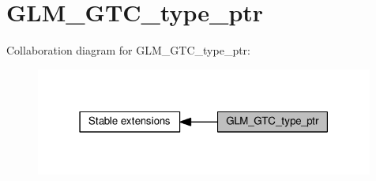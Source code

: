 \hypertarget{group__gtc__type__ptr}{}\section{G\+L\+M\+\_\+\+G\+T\+C\+\_\+type\+\_\+ptr}
\label{group__gtc__type__ptr}
Collaboration diagram for G\+L\+M\+\_\+\+G\+T\+C\+\_\+type\+\_\+ptr\+:
\nopagebreak
\begin{figure}[H]
\begin{center}
\leavevmode
\includegraphics[width=315pt]{d1/d6c/group__gtc__type__ptr}
\end{center}
\end{figure}
